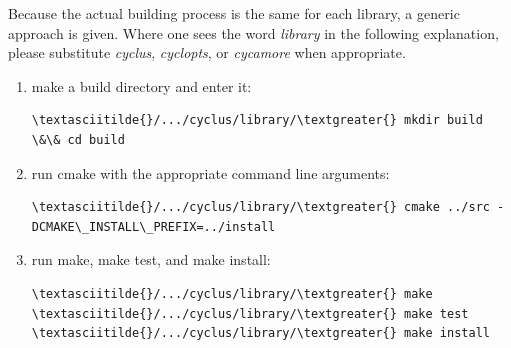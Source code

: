 \documentclass[letterpaper,10pt,english]{sphinxmanual}
\begin{document}
Because the actual building process is the same for each library, a
generic approach is given. Where one sees the word \emph{library} in the
following explanation, please substitute \emph{cyclus}, \emph{cyclopts}, or
\emph{cycamore} when appropriate.
\begin{enumerate}
\item {} 
make a build directory and enter it:

\begin{Verbatim}[commandchars=\\\{\}]
\textasciitilde{}/.../cyclus/library/\textgreater{} mkdir build \&\& cd build
\end{Verbatim}

\item {} 
run cmake with the appropriate command line arguments:

\begin{Verbatim}[commandchars=\\\{\}]
\textasciitilde{}/.../cyclus/library/\textgreater{} cmake ../src -DCMAKE\_INSTALL\_PREFIX=../install
\end{Verbatim}

\item {} 
run make, make test, and make install:

\begin{Verbatim}[commandchars=\\\{\}]
\textasciitilde{}/.../cyclus/library/\textgreater{} make
\textasciitilde{}/.../cyclus/library/\textgreater{} make test
\textasciitilde{}/.../cyclus/library/\textgreater{} make install
\end{Verbatim}

\end{enumerate}
\end{document}

